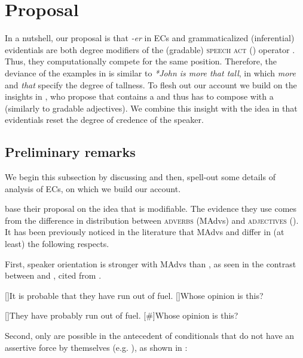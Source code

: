 \documentclass[output=paper,colorlinks,citecolor=brown,newtxmath]{langsci/langscibook}
\begin{document}
\section{Proposal}\label{proposal}
In a nutshell, our proposal is that \textit{-er} in ECs and grammaticalized (inferential) evidentials are both degree modifiers of the (gradable) \textsc{speech act} () operator . Thus, they computationally compete for the same position. Therefore, the deviance of the examples in  is similar to \textit{*John is more that tall}, in which \textit{more} and  \textit{that} specify the degree of tallness. To flesh out our account we build on  the insights in \citet{grewol17}, who propose that   contains a  and thus has to compose with a  (similarly to gradable adjectives). We combine this insight with the idea in \citet{davetal07} that evidentials reset the degree of credence of the speaker.

\subsection{Preliminary remarks} \label{PrelimRem}
We begin this subsection by discussing
\citet{grewol17} and then, spell-out some details of  analysis of ECs, on which we build our account.

\citet{grewol17} base their proposal on the idea that  is modifiable. The evidence they use comes from the difference in distribution between \textsc{ adverbs} (MAdvs) and \textsc{ adjectives} (). It has been previously noticed in the literature that MAdvs and  differ in (at least) the following respects.

 First, speaker orientation is stronger with MAdvs than , as seen in the contrast between  and , cited from \citet{grewol17}.

 	\ea \label{madven}
 	\ea\label{madvena}
 	\begin{xlist}
 	{It is probable that they have run out of fuel.}
 	{Whose opinion is this?}
    \end{xlist}
		\ex\label{madvenb}
	\begin{xlist}
	[]{They have probably run out of fuel.}
	[\#]{Whose opinion is this?}
			\end{xlist}
            \z\z

\noindent Second, only  are possible in the antecedent of conditionals that do not have an assertive force by themselves (e.g. \citealt{kra91}), as shown in :
\end{document}
